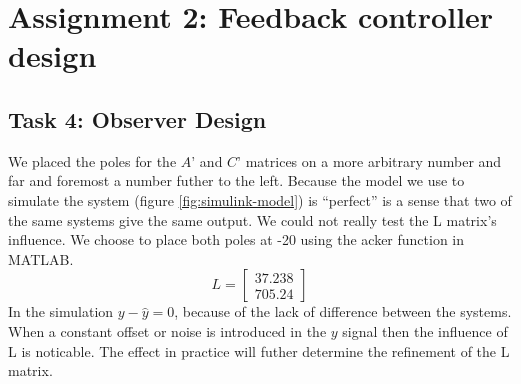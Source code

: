 \documentclass[final]{scrreprt} %
\begin{document}
\chapter{Assignment 2: Feedback controller design}
\label{ch:mod3-ass2}
\section{Task 4: Observer Design}
\label{sec:mod3-tsk4}
We placed the poles for the $A’$ and $C’$ matrices on a more arbitrary number and far and foremost a number futher to the left.
Because the model we use to simulate the system (figure \ref{fig:simulink-model}) is “perfect” is a sense that two of the same systems give the same output.
We could not really test the L matrix’s influence.
We choose to place both poles at -20 using the acker function in MATLAB.
\begin{equation}
L=
\begin{bmatrix}
  37.238 \\
  705.24
 \end{bmatrix}
\end{equation}
In the simulation $y-\hat{y}=0$, because of the lack of difference between the systems.
When a constant offset or noise is introduced in the $y$ signal then the influence of L is noticable.
The effect in practice will futher determine the refinement of the L matrix.
\end{document}

